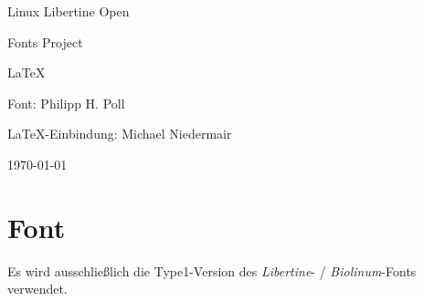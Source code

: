 \documentclass{fontdokuold}
\begin{document}
\thispagestyle{empty}

\begin{minipage}{\linewidth}\fontsize{36pt}{40pt}\FontLibertine
   \textcolor{red}{}\quad%
   \fontsize{36pt}{40pt}\FontLibertine%
    Linux Libertine Open\par
   \hfill\fontsize{36pt}{40pt}\FontLibertine%
   Fonts Project\quad%
   \fontsize{36pt}{40pt}\FontLibertine%
   \textcolor{red}{}\par
   \centering%
\end{minipage}

\vfill
\begin{center}
   \fontsize{46pt}{46pt}\FontLibertine%
   \LaTeX
\end{center}

\vfill
\begin{center}\fontsize{20pt}{18pt}\FontLibertine
Font: Philipp H. Poll\par \LaTeX-Einbindung: Michael Niedermair
\end{center}

\vfill
\begin{center}
{\fontsize{6cm}{6cm}\FontLibertine%
}%
\hfill\fontsize{20pt}{18pt}\FontLibertine\today
\end{center}
\newpage

\tableofcontents
\newpage

\chapter{Font}

Es wird ausschließlich die Type1-Version des \emph{Libertine}- / \emph{Biolinum}-Fonts verwendet.



% 
%
%
%
%
\end{document}
